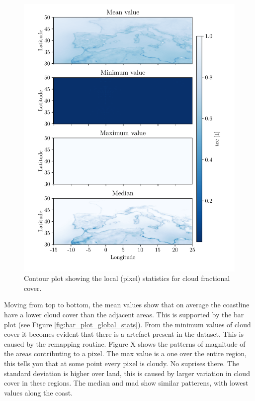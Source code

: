\begin{figure}[ht]
    \centering
    \includegraphics{python_figs/all_stat_variable_tcc.pdf}
    \caption{Contour plot showing the local (pixel) statistics for cloud fractional cover.}
    \label{fig:all_stats_tcc}
\end{figure}
Moving from top to bottom, the mean values show that on average the coastline have a lower cloud cover than the adjacent areas. This is supported by the bar plot (see Figure \ref{fig:bar_plot_global_stats}). From the minimum values of cloud cover it becomes evident that there is a  artefact present in the dataset. This is caused by the remapping routine. Figure X shows the patterns of magnitude of the areas contributing to a pixel. The max value is a one over the entire region, this tells you that at some point every pixel is cloudy. No suprises there. 
The standard deviation is higher over land, this is caused by larger variation in cloud cover in these regions. The median and mad show similar patterens, with lowest values along the coast.

